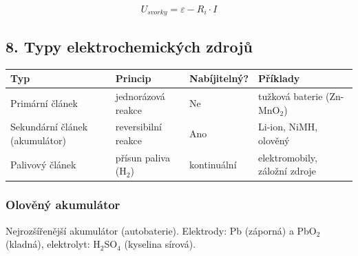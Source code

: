 \documentclass[a4paper,10pt]{article}
\begin{document}
\begin{vysvetlenibox}
\begin{vzorcebox}
\[
U_{svorky} = \varepsilon - R_i \cdot I
\]
\end{vzorcebox}

\subsection*{8. Typy elektrochemických zdrojů}

\begin{center}
\begin{tabularx}{0.97\linewidth}{@{} l X X X @{}}
\toprule
\textbf{Typ} & \textbf{Princip} & \textbf{Nabíjitelný?} & \textbf{Příklady} \\
\midrule
Primární článek & jednorázová reakce & Ne & tužková baterie (Zn-MnO$_2$) \\
Sekundární článek (akumulátor) & reversibilní reakce & Ano & Li-ion, NiMH, olověný \\
Palivový článek & přísun paliva (H$_2$) & kontinuální & elektromobily, záložní zdroje \\
\bottomrule
\end{tabularx}
\end{center}

\subsubsection*{Olověný akumulátor}

Nejrozšířenější akumulátor (autobaterie). Elektrody: Pb (záporná) a PbO$_2$ (kladná), elektrolyt: H$_2$SO$_4$ (kyselina sírová).

\begin{center}
\end{center}
\end{vysvetlenibox}
\end{document}
